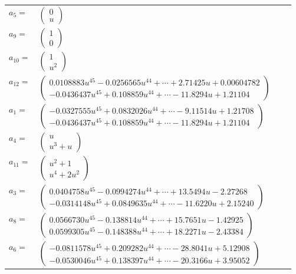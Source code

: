 \documentclass[1p]{elsarticle_modified}
\theoremstyle{definition}
\begin{document}
\begin{tabular}{m{7pt} m{180pt} m{7pt} m{180pt} }
\flushright $a_{5}=$&$\begin{pmatrix}0\\u\end{pmatrix}$ \\
\flushright $a_{9}=$&$\begin{pmatrix}1\\0\end{pmatrix}$ \\
\flushright $a_{10}=$&$\begin{pmatrix}1\\u^2\end{pmatrix}$ \\
\flushright $a_{12}=$&$\begin{pmatrix}0.0108883 u^{45}-0.0256565 u^{44}+\cdots+2.71425 u+0.00604782\\-0.0436437 u^{45}+0.108859 u^{44}+\cdots-11.8294 u+1.21104\end{pmatrix}$ \\
\flushright $a_{1}=$&$\begin{pmatrix}-0.0327555 u^{45}+0.0832026 u^{44}+\cdots-9.11514 u+1.21708\\-0.0436437 u^{45}+0.108859 u^{44}+\cdots-11.8294 u+1.21104\end{pmatrix}$ \\
\flushright $a_{4}=$&$\begin{pmatrix}u\\u^3+u\end{pmatrix}$ \\
\flushright $a_{11}=$&$\begin{pmatrix}u^2+1\\u^4+2 u^2\end{pmatrix}$ \\
\flushright $a_{3}=$&$\begin{pmatrix}0.0404758 u^{45}-0.0994274 u^{44}+\cdots+13.5494 u-2.27268\\-0.0314148 u^{45}+0.0849635 u^{44}+\cdots-11.6220 u+2.15240\end{pmatrix}$ \\
\flushright $a_{8}=$&$\begin{pmatrix}0.0566730 u^{45}-0.138814 u^{44}+\cdots+15.7651 u-1.42925\\0.0599305 u^{45}-0.148388 u^{44}+\cdots+18.2271 u-2.43384\end{pmatrix}$ \\
\flushright $a_{6}=$&$\begin{pmatrix}-0.0811578 u^{45}+0.209282 u^{44}+\cdots-28.8041 u+5.12908\\-0.0530046 u^{45}+0.138397 u^{44}+\cdots-20.3166 u+3.95052\end{pmatrix}$ \\

\end{tabular}
\end{document}
